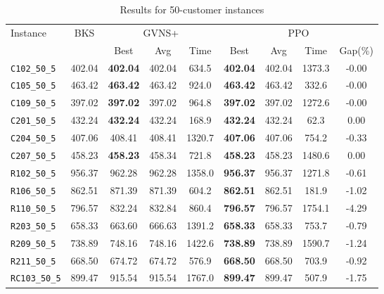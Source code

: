 \begin{table}[ht]
\centering
\small
\setlength{\tabcolsep}{5pt}
\caption{Results for 50-customer instances}
\vspace{4mm}
\begin{adjustbox}{width=\textwidth}
\begin{tabular}{l c c c c @{\hspace{8pt}} c c c c @{\hspace{8pt}}}
\toprule
\multirow{2}{*}{Instance} & \multirow{2}{*}{BKS} & \multicolumn{3}{c}{GVNS+} & \multicolumn{4}{c}{PPO} \\
\cmidrule(lr){3-5} \cmidrule(lr){6-9}
 &  & Best & Avg & Time & Best & Avg & Time & Gap(\%) \\
\midrule
\texttt{C102\_50\_5} & 402.04 & \textbf{402.04} & 402.04 & 634.5 & \textbf{402.04} & 402.04 & 1373.3 & -0.00 \\
\texttt{C105\_50\_5} & 463.42 & \textbf{463.42} & 463.42 & 924.0 & \textbf{463.42} & 463.42 & 332.6 & -0.00 \\
\texttt{C109\_50\_5} & 397.02 & \textbf{397.02} & 397.02 & 964.8 & \textbf{397.02} & 397.02 & 1272.6 & -0.00 \\
\texttt{C201\_50\_5} & 432.24 & \textbf{432.24} & 432.24 & 168.9 & \textbf{432.24} & 432.24 & 62.3 & 0.00 \\
\texttt{C204\_50\_5} & 407.06 & 408.41 & 408.41 & 1320.7 & \textbf{407.06} & 407.06 & 754.2 & -0.33 \\
\texttt{C207\_50\_5} & 458.23 & \textbf{458.23} & 458.34 & 721.8 & \textbf{458.23} & 458.23 & 1480.6 & 0.00 \\
\texttt{R102\_50\_5} & 956.37 & 962.28 & 962.28 & 1358.0 & \textbf{956.37} & 956.37 & 1271.8 & -0.61 \\
\texttt{R106\_50\_5} & 862.51 & 871.39 & 871.39 & 604.2 & \textbf{862.51} & 862.51 & 181.9 & -1.02 \\
\texttt{R110\_50\_5} & 796.57 & 832.24 & 832.84 & 860.4 & \textbf{796.57} & 796.57 & 1754.1 & -4.29 \\
\texttt{R203\_50\_5} & 658.33 & 663.60 & 666.63 & 1391.2 & \textbf{658.33} & 658.33 & 753.7 & -0.79 \\
\texttt{R209\_50\_5} & 738.89 & 748.16 & 748.16 & 1422.6 & \textbf{738.89} & 738.89 & 1590.7 & -1.24 \\
\texttt{R211\_50\_5} & 668.50 & 674.72 & 674.72 & 576.9 & \textbf{668.50} & 668.50 & 703.9 & -0.92 \\
\texttt{RC103\_50\_5} & 899.47 & 915.54 & 915.54 & 1767.0 & \textbf{899.47} & 899.47 & 507.9 & -1.75 \\

\end{tabular}
\end{adjustbox}
\end{table}
